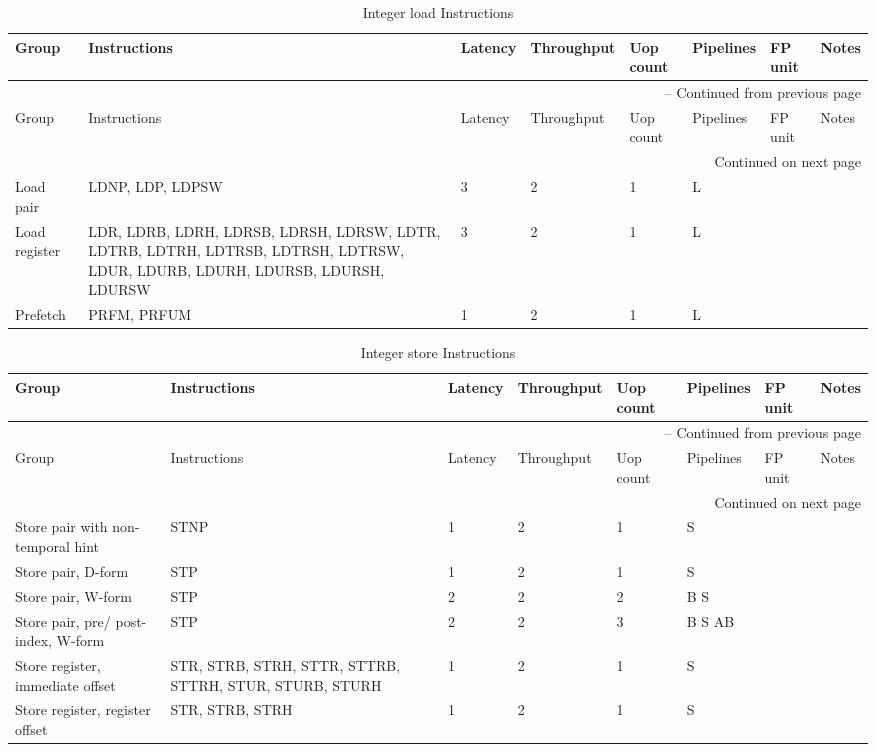 \newpage
\begin{longtable}{|p{1in}|p{1in}|l|l|l|p{1in}|l|p{1in}|}
\caption{Integer load Instructions} \\
\hline
Group & Instructions & Latency & Throughput & Uop count & Pipelines & FP unit & Notes\\
\hline
\endfirsthead
\hline
\multicolumn{8}{|r|}{{\tablename\ \thetable{} -- Continued from previous page}} \\
\hline
Group & Instructions & Latency & Throughput & Uop count & Pipelines & FP unit & Notes\\
\hline
\endhead
\hline
\multicolumn{8}{|r|}{{Continued on next page}} \\
\hline
\endfoot
\hline
\endlastfoot
Load pair & LDNP, LDP, LDPSW & 3 & 2 & 1 & L &  & \\
\hline
Load register & LDR, LDRB, LDRH, LDRSB, LDRSH, LDRSW, LDTR, LDTRB, LDTRH, LDTRSB, LDTRSH, LDTRSW, LDUR, LDURB, LDURH, LDURSB, LDURSH, LDURSW & 3 & 2 & 1 & L &  & \\
\hline
Prefetch & PRFM, PRFUM & 1 & 2 & 1 & L &  & \\
\hline
\end{longtable}
\newpage
\begin{longtable}{|p{1in}|p{1in}|l|l|l|p{1in}|l|p{1in}|}
\caption{Integer store Instructions} \\
\hline
Group & Instructions & Latency & Throughput & Uop count & Pipelines & FP unit & Notes\\
\hline
\endfirsthead
\hline
\multicolumn{8}{|r|}{{\tablename\ \thetable{} -- Continued from previous page}} \\
\hline
Group & Instructions & Latency & Throughput & Uop count & Pipelines & FP unit & Notes\\
\hline
\endhead
\hline
\multicolumn{8}{|r|}{{Continued on next page}} \\
\hline
\endfoot
\hline
\endlastfoot
Store pair with non-temporal hint & STNP & 1 & 2 & 1 & S &  & \\
\hline
Store pair, D-form & STP & 1 & 2 & 1 & S &  & \\
\hline
Store pair, W-form & STP & 2 & 2 & 2 & B S &  & \\
\hline
Store pair, pre/ post-index, W-form & STP & 2 & 2 & 3 & B S AB &  & \\
\hline
Store register, immediate offset & STR, STRB, STRH, STTR, STTRB, STTRH, STUR, STURB, STURH & 1 & 2 & 1 & S &  & \\
\hline
Store register, register offset & STR, STRB, STRH & 1 & 2 & 1 & S &  & \\
\hline
\end{longtable}
